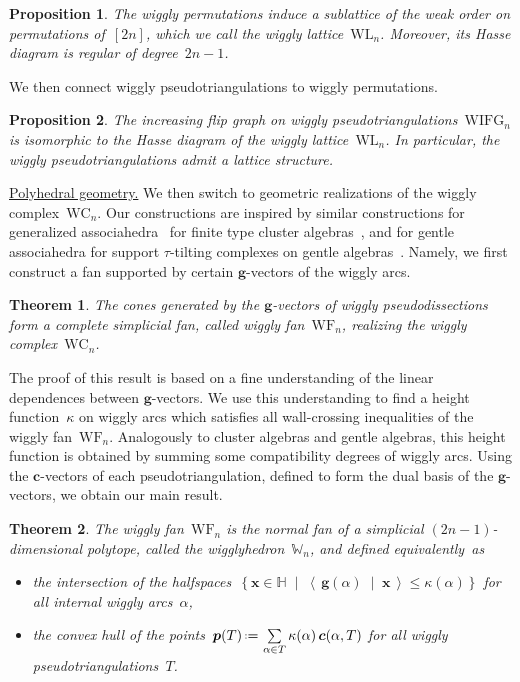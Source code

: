 \documentclass{amsart}
\newtheorem*{theorem*}{Theorem}%
\newtheorem*{proposition*}{Proposition}%
\theoremstyle{definition}
\newcommand{\HH}{\mathbb{H}} %
\renewcommand{\b}[1]{{\boldsymbol{#1}}} %
\newcommand{\set}[2]{\left\{ #1 \;\middle|\; #2 \right\}} %
\newcommand{\dotprod}[2]{\left\langle \, #1 \; \middle| \; #2 \, \right\rangle} %
\newcommand{\eqdef}{\mbox{\,\raisebox{0.2ex}{\scriptsize\ensuremath{\mathrm:}}\ensuremath{=}\,}} %
\newcommand{\darkblue}{\color{darkblue}} %
\newcommand{\defn}[1]{\textsl{\darkblue #1}} %
\newcommand{\para}[1]{\smallskip\noindent\uline{#1.}} %
\newcommand{\polytope}[1]{\mathds{#1}} %
\newcommand{\wigglyComplex}{\mathrm{WC}} %
\newcommand{\wigglyIncreasingFlipGraph}{\mathrm{WIFG}} %
\newcommand{\wigglyLattice}{\mathrm{WL}} %
\newcommand{\wigglyFan}{\mathrm{WF}} %
\newcommand{\wigglyhedron}{\polytope{W}} %
\begin{document}
\begin{proposition*}
The wiggly permutations induce a sublattice of the weak order on permutations of~$[2n]$, which we call the \defn{wiggly lattice}~$\wigglyLattice_n$. Moreover, its Hasse diagram is regular of degree~$2n-1$.
\end{proposition*}

\pagebreak
We then connect wiggly pseudotriangulations to wiggly permutations.

\begin{proposition*}
The increasing flip graph on wiggly pseudotriangulations~$\wigglyIncreasingFlipGraph_n$ is isomorphic to the Hasse diagram of the wiggly lattice~$\wigglyLattice_n$. In particular, the wiggly pseudotriangulations admit a lattice structure.
\end{proposition*}

\para{Polyhedral geometry}
We then switch to geometric realizations of the wiggly complex~$\wigglyComplex_n$.
Our constructions are inspired by similar constructions for generalized associahedra~\cite{HohlwegLangeThomas,HohlwegPilaudStella} for finite type cluster algebras~\cite{FominZelevinsky-ClusterAlgebrasI,FominZelevinsky-ClusterAlgebrasII}, and for gentle associahedra for support $\tau$-tilting complexes on gentle algebras~\cite{PaluPilaudPlamondon-nonkissing}.
Namely, we first construct a fan supported by certain $\b{g}$-vectors of the wiggly arcs.

\begin{theorem*}
The cones generated by the $\b{g}$-vectors of wiggly pseudodissections form a complete simplicial fan, called \defn{wiggly fan}~$\wigglyFan_n$, realizing the wiggly complex~$\wigglyComplex_n$.
\end{theorem*}

The proof of this result is based on a fine understanding of the linear dependences between $\b{g}$-vectors.
We use this understanding to find a height function~$\kappa$ on wiggly arcs which satisfies all wall-crossing inequalities of the wiggly fan~$\wigglyFan_n$.
Analogously to cluster algebras and gentle algebras, this height function is obtained by summing some compatibility degrees of wiggly arcs.
Using the $\b{c}$-vectors of each pseudotriangulation, defined to form the dual basis of the $\b{g}$-vectors, we obtain our main result.

\begin{theorem*}
The wiggly fan~$\wigglyFan_n$ is the normal fan of a simplicial $(2n-1)$-dimensional polytope, called the \defn{wigglyhedron}~$\wigglyhedron_n$, and defined equivalently~as
\begin{itemize}
\item the intersection of the halfspaces~$\set{\b{x} \in \HH}{\dotprod{\b{g}(\alpha)}{\b{x}} \le \kappa(\alpha)}$ for all internal wiggly arcs~$\alpha$,
\item the convex hull of the points~$\b{p}(T) \eqdef \sum\limits_{\alpha \in T} \kappa(\alpha) \, \b{c}(\alpha, T)$ for all wiggly pseudotriangulations~$T$.
\end{itemize}
\end{theorem*}
\end{document}
